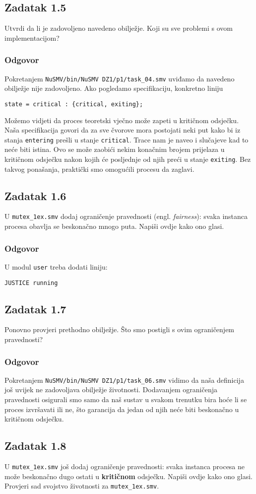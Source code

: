 \documentclass{article}
\newcommand{\code}[1]{\colorbox{blue!15}{\texttt{#1}}}
\newcommand{\odgovor}{\subsubsection*{Odgovor}}
\newcommand{\zadatak}[1]{\subsection{Zadatak #1}}
\begin{document}
\zadatak{1.5}

Utvrdi da li je zadovoljeno navedeno obilježje. Koji su sve problemi s ovom implementacijom?

\odgovor

Pokretanjem \code{NuSMV/bin/NuSMV DZ1/p1/task\_04.smv} uviđamo da navedeno obilježje nije zadovoljeno. Ako pogledamo specifikaciju, konkretno liniju

\begin{verbatim}
state = critical : {critical, exiting};
\end{verbatim}

\noindent
Možemo vidjeti da proces teoretski vječno može zapeti u kritičnom odsječku. Naša specifikacija govori da za sve čvorove mora postojati neki put kako bi iz stanja \code{entering} prešli u stanje \code{critical}. Trace nam je naveo i slučajeve kad to neće biti istina. Ovo se može zaobići nekim konačnim brojem prijelaza u kritičnom odsječku nakon kojih će posljednje od njih preći u stanje \code{exiting}. Bez takvog ponašanja, praktički smo omogućili procesu da zaglavi.


\zadatak{1.6}

U \code{mutex\_1ex.smv} dodaj ograničenje pravednosti (engl. \textit{fairness}): svaka instanca procesa obavlja se beskonačno mnogo puta. Napiši ovdje kako ono glasi.

\odgovor

U modul \code{user} treba dodati liniju:

\begin{verbatim}
JUSTICE running
\end{verbatim}
\pagebreak  %


\zadatak{1.7}

Ponovno provjeri prethodno obilježje. Što smo postigli s ovim ograničenjem pravednosti?

\odgovor

Pokretanjem \code{NuSMV/bin/NuSMV DZ1/p1/task\_06.smv} vidimo da naša definicija još uvijek ne zadovoljava obilježje životnosti. Dodavanjem ograničenja pravednosti osigurali smo samo da naš sustav u svakom trenutku bira hoće li se proces izvršavati ili ne, što garancija da jedan od njih neće biti beskonačno u kritičnom odsječku.



\zadatak{1.8}

U \code{mutex\_1ex.smv} još dodaj ograničenje pravednosti: svaka instanca procesa ne može beskonačno dugo ostati u \textbf{kritičnom} odsječku. Napiši ovdje kako ono glasi. Provjeri sad svojstvo životnosti za \code{mutex\_1ex.smv}.
\end{document}
